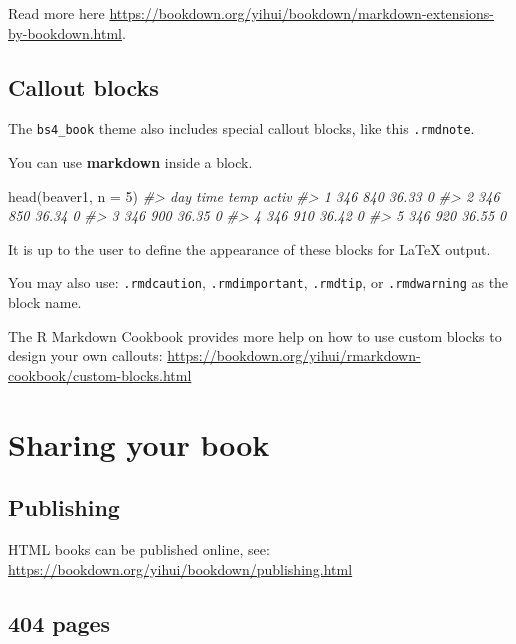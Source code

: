 \documentclass[
]{book}
\newenvironment{Shaded}{\begin{snugshade}}{\end{snugshade}}
\newcommand{\AttributeTok}[1]{\textcolor[rgb]{0.77,0.63,0.00}{#1}}
\newcommand{\CommentTok}[1]{\textcolor[rgb]{0.56,0.35,0.01}{\textit{#1}}}
\newcommand{\DecValTok}[1]{\textcolor[rgb]{0.00,0.00,0.81}{#1}}
\newcommand{\FunctionTok}[1]{\textcolor[rgb]{0.00,0.00,0.00}{#1}}
\newcommand{\NormalTok}[1]{#1}
\theoremstyle{definition}
\theoremstyle{definition}
\theoremstyle{definition}
\theoremstyle{definition}
\theoremstyle{remark}
\begin{document}
Read more here \url{https://bookdown.org/yihui/bookdown/markdown-extensions-by-bookdown.html}.

\hypertarget{callout-blocks}{%
\section{Callout blocks}\label{callout-blocks}}

The \texttt{bs4\_book} theme also includes special callout blocks, like this \texttt{.rmdnote}.

You can use \textbf{markdown} inside a block.

\begin{Shaded}
\begin{Highlighting}[]
\FunctionTok{head}\NormalTok{(beaver1, }\AttributeTok{n =} \DecValTok{5}\NormalTok{)}
\CommentTok{\#\textgreater{}   day time  temp activ}
\CommentTok{\#\textgreater{} 1 346  840 36.33     0}
\CommentTok{\#\textgreater{} 2 346  850 36.34     0}
\CommentTok{\#\textgreater{} 3 346  900 36.35     0}
\CommentTok{\#\textgreater{} 4 346  910 36.42     0}
\CommentTok{\#\textgreater{} 5 346  920 36.55     0}
\end{Highlighting}
\end{Shaded}

It is up to the user to define the appearance of these blocks for LaTeX output.

You may also use: \texttt{.rmdcaution}, \texttt{.rmdimportant}, \texttt{.rmdtip}, or \texttt{.rmdwarning} as the block name.

The R Markdown Cookbook provides more help on how to use custom blocks to design your own callouts: \url{https://bookdown.org/yihui/rmarkdown-cookbook/custom-blocks.html}

\hypertarget{sharing-your-book}{%
\chapter{Sharing your book}\label{sharing-your-book}}

\hypertarget{publishing}{%
\section{Publishing}\label{publishing}}

HTML books can be published online, see: \url{https://bookdown.org/yihui/bookdown/publishing.html}

\hypertarget{pages}{%
\section{404 pages}\label{pages}}
\end{document}
